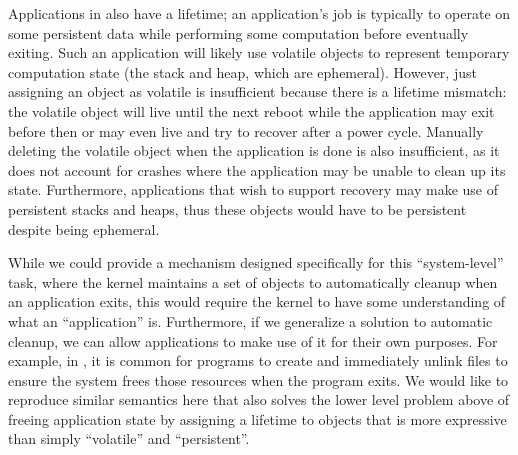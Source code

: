 Applications in \Twizzler also have a lifetime; an application's job is typically to operate on
some persistent data while performing some computation before eventually exiting. Such an
application will likely use volatile objects to represent temporary computation state (\eg the
stack and heap, which are ephemeral). However, just assigning an object as volatile is insufficient
because there is a lifetime mismatch: the volatile object will live until the next reboot while the
application may exit before then or may even live and try to recover after a power cycle.
Manually deleting the volatile object when the application is done is also insufficient, as it does
not account for crashes where the application may be unable to clean up its state. Furthermore,
applications that wish to support recovery may make use of persistent stacks and heaps, thus these
objects would have to be persistent despite being ephemeral.

While we could provide a mechanism designed specifically for this ``system-level'' task,
where the kernel maintains a set of objects to automatically cleanup when an application exits, this
would require the kernel to have some understanding of what an ``application'' is. Furthermore, if
we generalize a solution to automatic cleanup, we can allow applications to make use of it for their
own purposes. For example, in \unix, it is common for programs to create and immediately unlink
files to ensure the system frees those resources when the program exits. We would like to reproduce
similar semantics here that also solves the lower level problem above of freeing application state
by assigning a lifetime to objects that is more expressive than simply ``volatile'' and
``persistent''.

